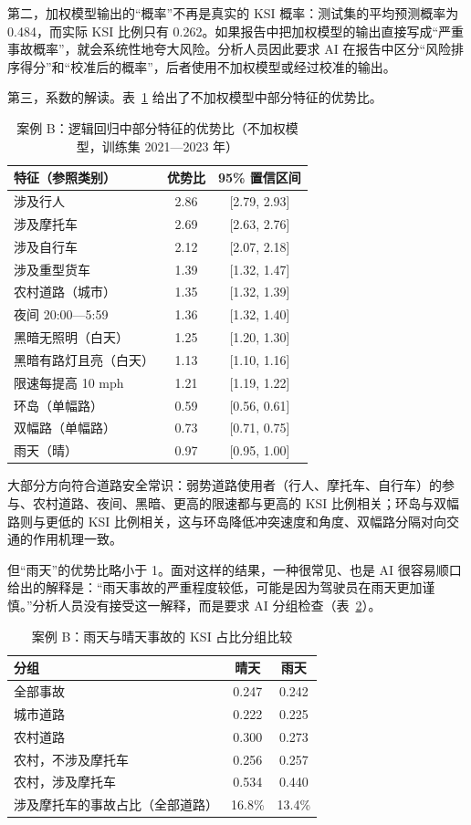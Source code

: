 第二，加权模型输出的“概率”不再是真实的 KSI 概率：测试集的平均预测概率为 0.484，而实际 KSI 比例只有 0.262。如果报告中把加权模型的输出直接写成“严重事故概率”，就会系统性地夸大风险。分析人员因此要求 AI 在报告中区分“风险排序得分”和“校准后的概率”，后者使用不加权模型或经过校准的输出\cite{guo2017calibration}。

第三，系数的解读。表~\ref{tab:ch8_or} 给出了不加权模型中部分特征的优势比。

\begin{table}[H]
\centering
\caption{案例 B：逻辑回归中部分特征的优势比（不加权模型，训练集 2021—2023 年）}
\label{tab:ch8_or}
\begin{tabular}{p{6.4cm}cc}
\toprule
特征（参照类别） & 优势比 & 95\% 置信区间 \\
\midrule
涉及行人 & 2.86 & [2.79, 2.93] \\
涉及摩托车 & 2.69 & [2.63, 2.76] \\
涉及自行车 & 2.12 & [2.07, 2.18] \\
涉及重型货车 & 1.39 & [1.32, 1.47] \\
农村道路（城市） & 1.35 & [1.32, 1.39] \\
夜间 20:00—5:59 & 1.36 & [1.32, 1.40] \\
黑暗无照明（白天） & 1.25 & [1.20, 1.30] \\
黑暗有路灯且亮（白天） & 1.13 & [1.10, 1.16] \\
限速每提高 10 mph & 1.21 & [1.19, 1.22] \\
环岛（单幅路） & 0.59 & [0.56, 0.61] \\
双幅路（单幅路） & 0.73 & [0.71, 0.75] \\
雨天（晴） & 0.97 & [0.95, 1.00] \\
\bottomrule
\end{tabular}
\end{table}

大部分方向符合道路安全常识：弱势道路使用者（行人、摩托车、自行车）的参与、农村道路、夜间、黑暗、更高的限速都与更高的 KSI 比例相关；环岛与双幅路则与更低的 KSI 比例相关，这与环岛降低冲突速度和角度、双幅路分隔对向交通的作用机理一致。

但“雨天”的优势比略小于 1。面对这样的结果，一种很常见、也是 AI 很容易顺口给出的解释是：“雨天事故的严重程度较低，可能是因为驾驶员在雨天更加谨慎。”分析人员没有接受这一解释，而是要求 AI 分组检查（表~\ref{tab:ch8_rain}）。

\begin{table}[H]
\centering
\caption{案例 B：雨天与晴天事故的 KSI 占比分组比较}
\label{tab:ch8_rain}
\begin{tabular}{lcc}
\toprule
分组 & 晴天 & 雨天 \\
\midrule
全部事故 & 0.247 & 0.242 \\
城市道路 & 0.222 & 0.225 \\
农村道路 & 0.300 & 0.273 \\
\quad 农村，不涉及摩托车 & 0.256 & 0.257 \\
\quad 农村，涉及摩托车 & 0.534 & 0.440 \\
涉及摩托车的事故占比（全部道路） & 16.8\% & 13.4\% \\
\bottomrule
\end{tabular}
\end{table}

